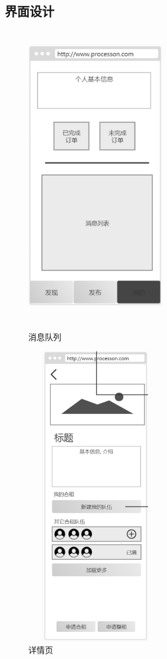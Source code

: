 \subsection{界面设计}
\begin{figure}[htbp]
    \centering
    \begin{minipage}[t]{0.48\textwidth}
    \centering
    \includegraphics[width=6cm,height=13cm]{design/image/ui8.png} 
    \caption{消息队列}
    \end{minipage}
    \begin{minipage}[t]{0.48\textwidth}
    \centering
    \includegraphics[width=6cm,height=13cm]{design/image/ui5.png}
    \caption{详情页}
    \end{minipage}
    \end{figure}

